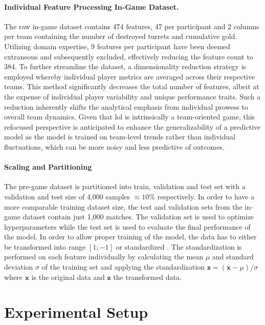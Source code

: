 \documentclass[12pt, a4paper, headinclude, twoside, plainheadsepline, open=right, numbers=noenddot, hidelinks, toc=listof, toc=bibliography]{scrreprt}
\begin{document}
\paragraph{Individual Feature Processing In-Game Dataset.}
The raw in-game dataset contains 474 features, 47 per participant and 2 columns per team containing the number of destroyed turrets and cumulative gold.
Utilizing domain expertise, 9 features per participant have been deemed extraneous and subsequently excluded, effectively reducing the feature count to 384. 
To further streamline the dataset, a dimensionality reduction strategy is employed whereby individual player metrics are averaged across their respective teams.
This method significantly decreases the total number of features, albeit at the expense of individual player variability and unique performance traits.
Such a reduction inherently shifts the analytical emphasis from individual prowess to overall team dynamics. 
Given that \ac{lol} is intrinsically a team-oriented game, this refocused perspective is anticipated to enhance the generalizability of a predictive model as the model is trained on team-level trends rather than individual fluctuations, which can be more noisy and less predictive of outcomes.

\paragraph{Scaling and Partitioning}
The pre-game dataset is partitioned into train, validation and test set with a validation and test size of 4,000 samples $ \approx 10\%$ respectively.
In order to have a more comparable training dataset size, the test and validation sets from the in-game dataset contain just 1,000 matches.
The validation set is used to optimize hyperparameters while the test set is used to evaluate the final performance of the model.
In order to allow proper training of the model, the data has to either be transformed into range $[1;-1]$ or standardized \cite{shankerEffectDataStandardization1996}.
The standardization is performed on each feature individually by calculating the mean $\mu$ and standard deviation $\sigma$ of the training set and applying the standardization $\mathbf{z} = (\mathbf{x} - \mu) / \sigma$ where $\mathbf{x}$ is the original data and $\mathbf{z}$ the transformed data.


\section{Experimental Setup}
\label{sec:exper_setup}
\end{document}
